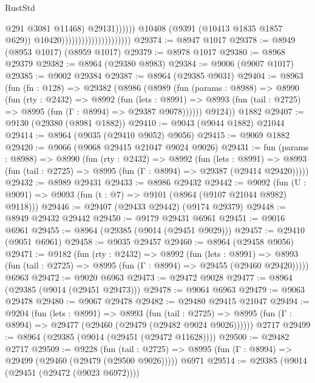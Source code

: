 \begin{lexlean}{RustStd}
\begin{coremodule}
                                                            @291
                                                            @3081
                                                            @11468)
                                                          @29131))))))
                                              @10408
                                              (@9391 (@10413 @1835 @1857 @629))
                                              @10420)))))))))))))))))))))
@29374 := @8947 @1017
@29378 := @8949 (@8953 @1017) (@8959 @1017)
@29379 := @8978 @1017
@29380 := @8968 @29379
@29382 := @8964 (@29380 @8983)
@29384 := @9006 (@9007 @1017)
@29385 := @9002 @29384
@29387 := @8964 (@29385 @9031)
@29404 := @8963
    (fun (fn : @128) =>
    @29382
      (@8986
        (@8989
          (fun (params : @8988) =>
          @8990
            (fun (rty : @2432) =>
            @8992
              (fun (lets : @8991) =>
              @8993 (fun (tail : @2725) => @8995 (fun (Γ : @8994) => @29387 @9078))))))
        @9124))
    @1882
@29407 := @9130 (@29380 (@8981 @1882))
@29410 := @9043 (@9044 @1882) @21044
@29414 := @8964 (@9035 (@29410 @9052) @9056)
@29415 := @9069 @1882
@29420 := @9066 (@9068 @29415 @21047 @9024 @9026)
@29431 := fun (params : @8988) =>
  @8990
    (fun (rty : @2432) =>
    @8992
      (fun (lets : @8991) =>
      @8993 (fun (tail : @2725) => @8995 (fun (Γ : @8994) => @29387 (@29414 @29420)))))
@29432 := @8989 @29431
@29433 := @8986 @29432
@29442 := @9092
    (fun (U : @9091) => @9093 (fun (t : @7) => @9101 (@8964 (@9107 @21044 @8982) @9118)))
@29446 := @29407 (@29433 @29442) (@9174 @29379)
@29448 := @8949 @29432 @29442
@29450 := @9179 @29431 @6961
@29451 := @9016 @6961
@29455 := @8964 (@29385 (@9014 (@29451 @9029)))
@29457 := @29410 (@9051 @6961)
@29458 := @9035 @29457
@29460 := @8964 (@29458 @9056)
@29471 := @9182
    (fun (rty : @2432) =>
    @8992
      (fun (lets : @8991) =>
      @8993 (fun (tail : @2725) => @8995 (fun (Γ : @8994) => @29455 (@29460 @29420)))))
    @6963
@29472 := @9020 @6963
@29473 := @29472 @9028
@29477 := @8964 (@29385 (@9014 (@29451 @29473)))
@29478 := @9064 @6963
@29479 := @9063 @29478
@29480 := @9067 @29478
@29482 := @29480 @29415 @21047
@29494 := @9204
    (fun (lets : @8991) =>
    @8993
      (fun (tail : @2725) =>
      @8995 (fun (Γ : @8994) => @29477 (@29460 (@29479 (@29482 @9024 @9026))))))
    @2717
@29499 := @8964 (@29385 (@9014 (@29451 (@29472 @11628))))
@29500 := @29482 @2717
@29509 := @9228
    (fun (tail : @2725) => @8995 (fun (Γ : @8994) => @29499 (@29460 (@29479 (@29500 @9026)))))
    @6971
@29514 := @29385 (@9014 (@29451 (@29472 (@9023 @6972))))

\end{coremodule}
\end{lexlean}
